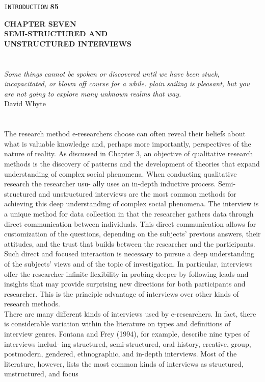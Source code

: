 \documentclass{book}
\begin{document}
\begin{flushright}
\texttt{INTRODUCTION}
\hspace*{0.5cm}
\textbf{85}
\end{flushright}
\vspace*{0.7cm}
\textbf{CHAPTER SEVEN} \\
\textbf{SEMI-STRUCTURED AND \\
UNSTRUCTURED INTERVIEWS} \\
\\
\vspace*{1cm}
\\
\emph{Some things cannot be spoken or discovered until we have been stuck,
incapacitated, or blown off course for a while. plain sailing is pleasant, but you
are not going to explore many unknown realms that way.} \\
David Whyte \\
\\
\vspace*{1cm}
\\
The research method e-researchers choose can often reveal their beliefs about what is
valuable knowledge and, perhaps more importantly, perspectives of the nature of
reality. As discussed in Chapter 3, an objective of qualitative research methods is the
discovery of patterns and the development of theories that expand understanding of
complex social phenomena. When conducting qualitative research the researcher usu-
ally uses an in-depth inductive process. Semi-structured and unstructured interviews
are the most common methods for achieving this deep understanding of complex social
phenomena. The interview is a unique method for data collection in that the
researcher gathers data through direct communication between individuals. This direct
communication allows for customization of the questions, depending on the subjects'
previous answers, their attitudes, and the trust that builds between the researcher and
the participants. Such direct and focused interaction is necessary to pursue a deep
understanding of the subjects' views and of the topic of investigation. In particular,
interviews offer the researcher infinite flexibility in probing deeper by following leads
and insights that may provide surprising new directions for both participants and
researcher. This is the principle advantage of interviews over other kinds of research
methods. \\
There are many different kinds of interviews used by e-researchers. In fact, there
is considerable variation within the literature on types and definitions of interview
genres. Fontana and Frey (1994), for example, describe nine types of interviews includ-
ing structured, semi-structured, oral history, creative, group, postmodern, gendered,
ethnographic, and in-depth interviews. Most of the literature, however, lists the most
common kinds of interviews as structured, unstructured, and focus
\end{document}
